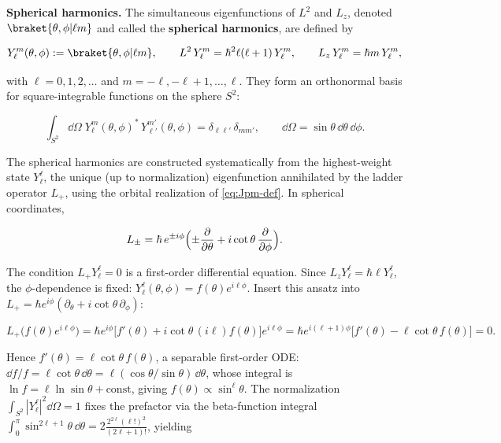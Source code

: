 \medskip\noindent\textbf{Spherical harmonics.}
The simultaneous eigenfunctions of $L^2$ and $L_z$, denoted $\braket{\theta,\phi|\ell m}$ and called the \textbf{spherical harmonics}, are defined by
\begin{linenomath}
  \begin{equation}
    Y_\ell^m(\theta,\phi) := \braket{\theta,\phi|\ell m},
    \qquad
    L^2\,Y_\ell^m = \hbar^2\ell(\ell+1)\,Y_\ell^m,
    \qquad
    L_z\,Y_\ell^m = \hbar m\,Y_\ell^m,
    \label{eq:spherical-harmonic-def}
  \end{equation}
\end{linenomath}
with $\ell = 0,1,2,\ldots$ and $m = -\ell,-\ell+1,\ldots,\ell$. They form an orthonormal basis for square-integrable functions on the sphere $S^2$:
\begin{linenomath}
  \begin{equation}
    \int_{S^2}\!\dd\Omega\; Y_\ell^m(\theta,\phi)^*\,Y_{\ell'}^{m'}(\theta,\phi)
    = \delta_{\ell\ell'}\,\delta_{mm'},
    \qquad
    \dd\Omega = \sin\theta\,\dd\theta\,\dd\phi.
  \end{equation}
\end{linenomath}
The spherical harmonics are constructed systematically from the highest-weight state $Y_\ell^\ell$, the unique (up to normalization) eigenfunction annihilated by the ladder operator $L_+$, using the orbital realization of \eqref{eq:Jpm-def}. In spherical coordinates,
\begin{linenomath}
  \begin{equation}
    L_\pm = \hbar\,e^{\pm i\phi}\Bigl(
      \pm\frac{\partial}{\partial\theta}
      + i\cot\theta\,\frac{\partial}{\partial\phi}
    \Bigr).
  \end{equation}
\end{linenomath}
The condition $L_+ Y_\ell^\ell = 0$ is a first-order differential equation. Since $L_z Y_\ell^\ell = \hbar\ell Y_\ell^\ell$, the $\phi$-dependence is fixed: $Y_\ell^\ell(\theta,\phi) = f(\theta)e^{i\ell\phi}$. Insert this ansatz into $L_+ = \hbar e^{i\phi}(\partial_\theta + i\cot\theta\,\partial_\phi)$:
\begin{linenomath}
\begin{equation*}
L_+\bigl(f(\theta)e^{i\ell\phi}\bigr)
= \hbar e^{i\phi}\bigl[f'(\theta) + i\cot\theta\,(i\ell)f(\theta)\bigr]e^{i\ell\phi}
= \hbar e^{i(\ell+1)\phi}\bigl[f'(\theta) - \ell\cot\theta\,f(\theta)\bigr] = 0.
\end{equation*}
\end{linenomath}
Hence $f'(\theta) = \ell\cot\theta\,f(\theta)$, a separable first-order ODE: $\dd f/f = \ell\cot\theta\,\dd\theta = \ell(\cos\theta/\sin\theta)\,\dd\theta$, whose integral is $\ln f = \ell\ln\sin\theta + \text{const}$, giving $f(\theta) \propto \sin^\ell\theta$. The normalization $\int_{S^2}|Y_\ell^\ell|^2\dd\Omega = 1$ fixes the prefactor via the beta-function integral $\int_0^\pi \sin^{2\ell+1}\theta\,\dd\theta = 2\frac{2^{2\ell}(\ell!)^2}{(2\ell+1)!}$, yielding
